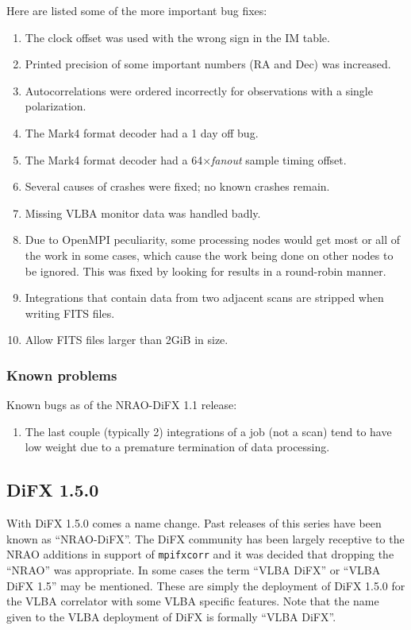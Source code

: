 Here are listed some of the more important bug fixes:
\begin{enumerate}
\item The clock offset was used with the wrong sign in the IM table.
\item Printed precision of some important numbers (RA and Dec) was increased.
\item Autocorrelations were ordered incorrectly for observations with a single polarization.
\item The Mark4 format decoder had a 1 day off bug.
\item The Mark4 format decoder had a 64$\times${\it fanout} sample timing offset.
\item Several causes of crashes were fixed; no known crashes remain.
\item Missing VLBA monitor data was handled badly.
\item Due to OpenMPI peculiarity, some processing nodes would get most or all of the work in some cases, which cause the work being done on other nodes to be ignored.  This was fixed by looking for results in a round-robin manner.
\item Integrations that contain data from two adjacent scans are stripped when writing FITS files.
\item Allow FITS files larger than 2GiB in size.
\end{enumerate}

\subsubsection{Known problems}

Known bugs as of the NRAO-DiFX 1.1 release:
\begin{enumerate}
\item The last couple (typically 2) integrations of a job (not a scan) tend to have low weight due to a premature termination of data processing.
\end{enumerate}

\subsection{DiFX 1.5.0}

With DiFX 1.5.0 comes a name change.
Past releases of this series have been known as ``NRAO-DiFX''.
The DiFX community has been largely receptive to the NRAO additions in support of {\tt mpifxcorr} and it was decided that dropping the ``NRAO'' was appropriate.
In some cases the term ``VLBA DiFX'' or ``VLBA DiFX 1.5'' may be mentioned.
These are simply the deployment of DiFX 1.5.0 for the VLBA correlator with some VLBA specific features.
Note that the name given to the VLBA deployment of DiFX is formally ``VLBA DiFX''.

